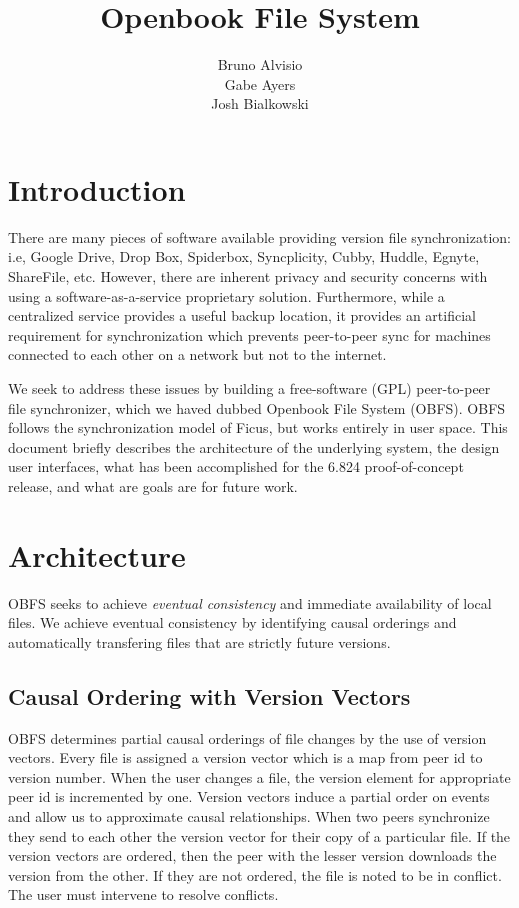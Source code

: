 \documentclass[10pt,twocolumn]{article}
\title{Openbook File System}
\author{Bruno Alvisio\\Gabe Ayers\\Josh Bialkowski}
\begin{document}
\maketitle
\section{Introduction}

There are many pieces of software available providing version file 
synchronization: i.e, Google Drive, Drop Box, Spiderbox, Syncplicity, Cubby,
Huddle, Egnyte, ShareFile, etc. However, there are inherent privacy and 
security concerns with using a software-as-a-service proprietary solution. 
Furthermore, while a centralized service provides a useful backup location, it
provides an artificial requirement for synchronization which prevents 
peer-to-peer sync for machines connected to each other on a network but not
to the internet.

We seek to address these issues by building a free-software (GPL) peer-to-peer
file synchronizer, which we haved dubbed Openbook File System (OBFS). OBFS
follows the synchronization model of Ficus, but works entirely in user space. 
This document briefly describes the architecture of the underlying system, 
the design user interfaces, what has been accomplished for the 6.824 
proof-of-concept release, and what are goals are for future work.  

\section{Architecture}

OBFS seeks to achieve \emph{eventual consistency} and immediate availability 
of local files. We achieve eventual consistency by identifying causal orderings
and automatically transfering files that are strictly future versions. 

\subsection{Causal Ordering with Version Vectors}
OBFS determines partial causal orderings of file changes by the use of version
vectors. Every file is assigned a version vector which is a map from peer id to
version number. When the user changes a file, the version element for appropriate
peer id is incremented by one. Version vectors induce a partial order on events
and allow us to approximate causal relationships. When two peers synchronize
they send to each other the version vector for their copy of a particular file.
If the version vectors are ordered, then the peer with the lesser version
downloads the version from the other. If they are not ordered, the file is noted
to be in conflict. The user must intervene to resolve conflicts.
\end{document}
